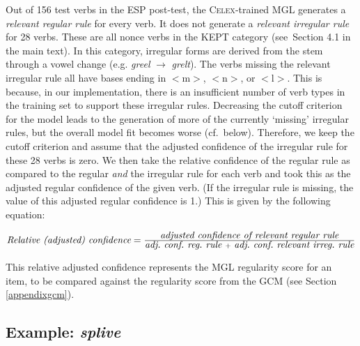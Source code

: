 \documentclass[12pt]{article}
\begin{document}
Out of 156 test verbs in the ESP post-test, the \textsc{Celex}-trained MGL generates a {\em relevant regular rule} for every verb. It does not generate a {\em relevant irregular rule} for 28 verbs. These are all nonce verbs in the \textsc{KEPT} category (see\ Section 4.1 in the main text). In this category, irregular forms are derived from the stem through a vowel change (e.g. {\em greel} $\rightarrow{}$ {\em grelt}). The verbs missing the relevant irregular rule all have bases ending in $<$m$>$, $<$n$>$, or $<$l$>$. This is because, in our implementation, there is an insufficient number of verb types in the training set to support these irregular rules. Decreasing the cutoff criterion for the model leads to the generation of more of the currently `missing' irregular rules, but the overall model fit becomes worse (cf.\ below). Therefore, we keep the cutoff criterion and assume that the adjusted confidence of the irregular rule for these 28 verbs is zero. We then take the relative confidence of the regular rule as compared to the regular {\em and} the irregular rule for each verb and took this as the adjusted regular confidence of the given verb. (If the irregular rule is missing, the value of this adjusted regular confidence is 1.) This is given by the following equation:

\vspace{1cm}
$\mbox{\it Relative (adjusted) confidence} = \frac{\mbox{\it  adjusted confidence of relevant regular rule}} {\mbox{\it  adj.\ conf.\ reg.\ rule } + \mbox{ \it adj.\ conf.\ relevant irreg.\ rule}}$
\vspace{1cm}

This relative adjusted confidence represents the MGL regularity score for an item, to be compared against the regularity score from the GCM (see Section \ref{appendixgcm}).  

\subsection{Example: {\em splive}}
\end{document}
